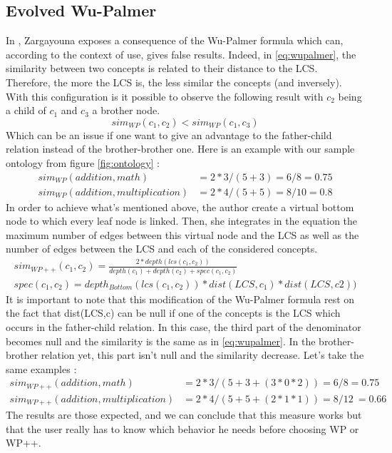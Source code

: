 \subsection{Evolved Wu-Palmer} %
\label{ssub:evolved_wu_palmer}
In \cite{zargayouna2004mesure}, Zargayouna exposes a consequence of the Wu-Palmer formula which can, according to the context of use, gives false results. Indeed, in \eqref{eq:wupalmer}, the similarity between two concepts is related to their distance to the LCS. Therefore, the more  the LCS is, the less similar the concepts (and inversely). With this configuration is it possible to observe the following result with $c_2$ being a child of $c_1$ and $c_3$ a brother node.
\begin{equation}
\label{eq:pbWPpp}
sim_{WP}(c_1, c_2) < sim_{WP}(c_1, c_3)
\end{equation}
Which can be an issue if one want to give an advantage to the father-child relation instead of the brother-brother one. Here is an example with our sample ontology from figure \ref{fig:ontology} :
\begin{align}
\label{eq:obsWPp}
sim_{WP}(addition, math)& = 2*3 / (5 + 3) = 6/8 = 0.75\\
sim_{WP}(addition, multiplication)& = 2*4 / (5 + 5) = 8/10 = 0.8
\end{align}
In order to achieve what's mentioned above, the author create a virtual bottom node to which every leaf node is linked. Then, she integrates in the equation the maximum number of edges between this virtual node and the LCS as well as the number of edges between the LCS and each of the considered concepts. 
\begin{align}
\label{eq:WPpp}
sim_{WP++}(c_1, c_2) = \frac{2*depth(lcs(c_1,c_2))}{depth(c_1) + depth(c_2) + spec(c_1,c_2)}\\
spec(c_1,c_2) = depth_{Bottom}(lcs(c_1,c_2))*dist(LCS, c_1)*dist(LCS,c2))
\end{align}
It is important to note that this modification of the Wu-Palmer formula rest on the fact that dist(LCS,c) can be null if one of the concepts is the LCS which occurs in the father-child relation. In this case, the third part of the denominator becomes null and the similarity is the same as in \eqref{eq:wupalmer}. In the brother-brother relation yet, this part isn't null and the similarity decrease. Let's take the same examples :
\begin{align}
\label{eq:resultWPp}
sim_{WP++}(addition, math)& = 2*3 / (5 + 3 + (3*0*2)) = 6/8 = 0.75\\
sim_{WP++}(addition, multiplication)& = 2*4 / (5 + 5 + (2*1*1)) = 8/12 ~= 0.66 
\end{align}
The results are those expected, and we can conclude that this measure works but that the user really has to know which behavior he needs before choosing WP or WP++.


